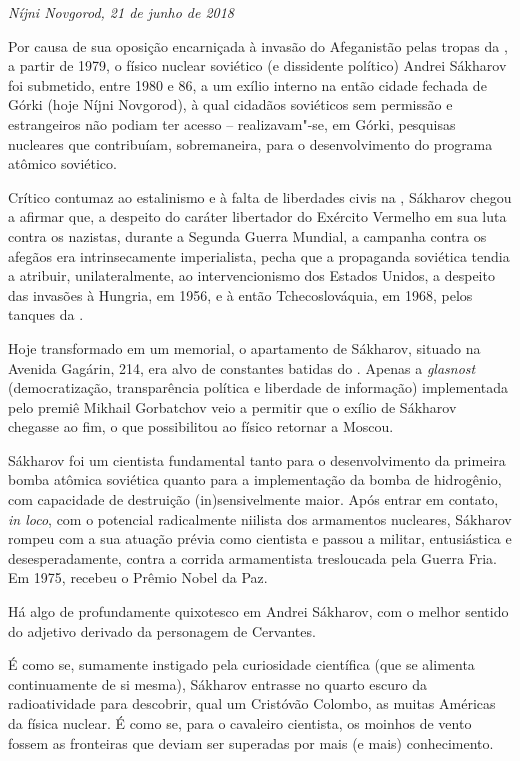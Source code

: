 \begin{flushright}
\emph{Níjni Novgorod, 21 de junho de 2018}
\end{flushright}

Por causa de sua oposição encarniçada à invasão do Afeganistão pelas
tropas da , a partir de 1979, o físico nuclear soviético (e
dissidente político) Andrei Sákharov foi submetido, entre 1980 e 86, a
um exílio interno na então cidade fechada de Górki (hoje Níjni
Novgorod), à qual cidadãos soviéticos sem permissão e estrangeiros não
podiam ter acesso -- realizavam"-se, em Górki, pesquisas nucleares que
contribuíam, sobremaneira, para o desenvolvimento do programa atômico
soviético.

Crítico contumaz ao estalinismo e à falta de liberdades civis na ,
Sákharov chegou a afirmar que, a despeito do caráter libertador do
Exército Vermelho em sua luta contra os nazistas, durante a Segunda
Guerra Mundial, a campanha contra os afegãos era intrinsecamente
imperialista, pecha que a propaganda soviética tendia a atribuir,
unilateralmente, ao intervencionismo dos Estados Unidos, a despeito das
invasões à Hungria, em 1956, e à então Tchecoslováquia, em 1968, pelos
tanques da .

Hoje transformado em um memorial, o apartamento de Sákharov, situado na
Avenida Gagárin, 214, era alvo de constantes batidas do . Apenas a
\emph{glasnost} (democratização, transparência política e liberdade de
informação) implementada pelo premiê Mikhail Gorbatchov veio a permitir
que o exílio de Sákharov chegasse ao fim, o que possibilitou ao físico
retornar a Moscou.

Sákharov foi um cientista fundamental tanto para o desenvolvimento da
primeira bomba atômica soviética quanto para a implementação da bomba de
hidrogênio, com capacidade de destruição (in)sensivelmente maior. Após
entrar em contato, \emph{in loco}, com o potencial radicalmente niilista
dos armamentos nucleares, Sákharov rompeu com a sua atuação prévia como
cientista e passou a militar, entusiástica e desesperadamente, contra a
corrida armamentista tresloucada pela Guerra Fria. Em 1975, recebeu o
Prêmio Nobel da Paz.

Há algo de profundamente quixotesco em Andrei Sákharov, com o melhor
sentido do adjetivo derivado da personagem de Cervantes.

É como se, sumamente instigado pela curiosidade científica (que se
alimenta continuamente de si mesma), Sákharov entrasse no quarto escuro
da radioatividade para descobrir, qual um Cristóvão Colombo, as muitas
Américas da física nuclear. É como se, para o cavaleiro cientista, os
moinhos de vento fossem as fronteiras que deviam ser superadas por mais
(e mais) conhecimento.

